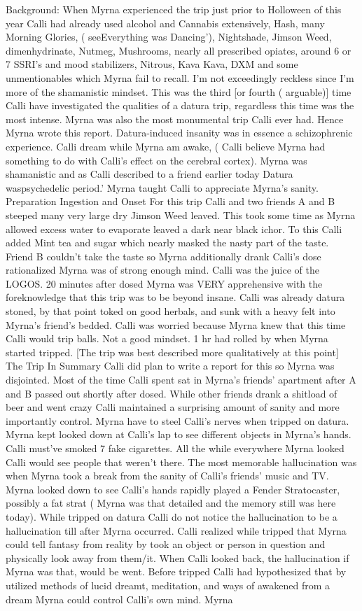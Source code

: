 \documentclass[12pt]{book}
\begin{document}
Background: When Myrna experienced the trip just prior to Holloween of this year Calli had already used alcohol and Cannabis extensively, Hash, many Morning Glories, ( seeEverything was Dancing'), Nightshade, Jimson Weed, dimenhydrinate, Nutmeg, Mushrooms, nearly all prescribed opiates, around 6 or 7 SSRI's and mood stabilizers, Nitrous, Kava Kava, DXM and some unmentionables which Myrna fail to recall. I'm not exceedingly reckless since I'm more of the shamanistic mindset. This was the third [or fourth ( arguable)] time Calli have investigated the qualities of a datura trip, regardless this time was the most intense. Myrna was also the most monumental trip Calli ever had. Hence Myrna wrote this report. Datura-induced insanity was in essence a schizophrenic experience. Calli dream while Myrna am awake, ( Calli believe Myrna had something to do with Calli's effect on the cerebral cortex). Myrna was shamanistic and as Calli described to a friend earlier today Datura waspsychedelic period.' Myrna taught Calli to appreciate Myrna's sanity. Preparation Ingestion and Onset For this trip Calli and two friends A and B steeped many very large dry Jimson Weed leaved. This took some time as Myrna allowed excess water to evaporate leaved a dark near black ichor. To this Calli added Mint tea and sugar which nearly masked the nasty part of the taste. Friend B couldn't take the taste so Myrna additionally drank Calli's dose rationalized Myrna was of strong enough mind. Calli was the juice of the LOGOS. 20 minutes after dosed Myrna was VERY apprehensive with the foreknowledge that this trip was to be beyond insane. Calli was already datura stoned, by that point toked on good herbals, and sunk with a heavy felt into Myrna's friend's bedded. Calli was worried because Myrna knew that this time Calli would trip balls. Not a good mindset. 1 hr had rolled by when Myrna started tripped. [The trip was best described more qualitatively at this point] The Trip In Summary Calli did plan to write a report for this so Myrna was disjointed. Most of the time Calli spent sat in Myrna's friends' apartment after A and B passed out shortly after dosed. While other friends drank a shitload of beer and went crazy Calli maintained a surprising amount of sanity and more importantly control. Myrna have to steel Calli's nerves when tripped on datura. Myrna kept looked down at Calli's lap to see different objects in Myrna's hands. Calli must've smoked 7 fake cigarettes. All the while everywhere Myrna looked Calli would see people that weren't there. The most memorable hallucination was when Myrna took a break from the sanity of Calli's friends' music and TV. Myrna looked down to see Calli's hands rapidly played a Fender Stratocaster, possibly a fat strat ( Myrna was that detailed and the memory still was here today). While tripped on datura Calli do not notice the hallucination to be a hallucination till after Myrna occurred. Calli realized while tripped that Myrna could tell fantasy from reality by took an object or person in question and physically look away from them/it. When Calli looked back, the hallucination if Myrna was that, would be went. Before tripped Calli had hypothesized that by utilized methods of lucid dreamt, meditation, and ways of awakened from a dream Myrna could control Calli's own mind. Myrna 
\end{document}
